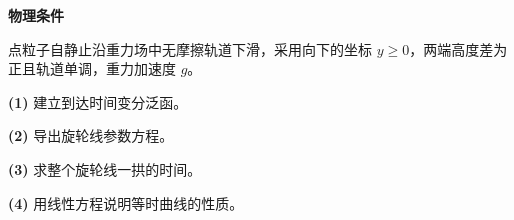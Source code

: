 \textbf{物理条件}\par 点粒子自静止沿重力场中无摩擦轨道下滑，采用向下的坐标 \(y\ge0\)，两端高度差为正且轨道单调，重力加速度 \(g\)。
\par\noindent\textbf{(1)} 建立到达时间变分泛函。
\par\noindent\textbf{(2)} 导出旋轮线参数方程。
\par\noindent\textbf{(3)} 求整个旋轮线一拱的时间。
\par\noindent\textbf{(4)} 用线性方程说明等时曲线的性质。

